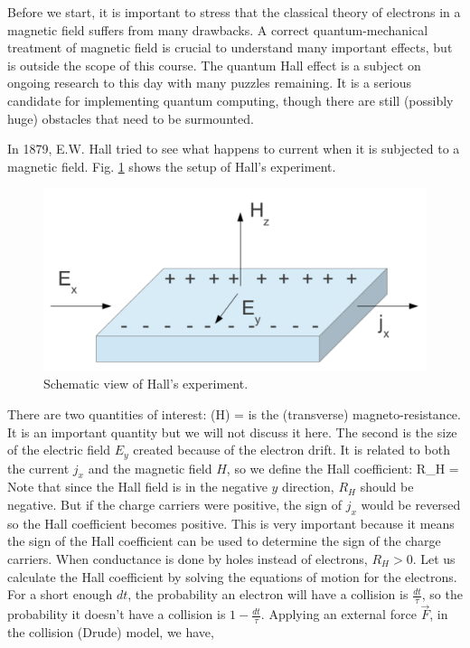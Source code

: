 \documentclass{Textbook}
\begin{document}
Before we start, it is important to stress that the classical theory of electrons in a magnetic field suffers from many drawbacks. A correct quantum-mechanical treatment of magnetic field is crucial to understand many important effects, but is outside the scope of this course. The quantum Hall effect is a subject on ongoing research to this day with many puzzles remaining. It is a serious candidate for implementing quantum computing, though there are still (possibly huge) obstacles that need to be surmounted.

\noindent In 1879, E.W. Hall tried to see what happens to current when it is subjected to a magnetic field. Fig. \ref{fig:Hall} shows the setup of Hall's experiment.\nl
\begin{figure}[!ht] 
  \centering
  \includegraphics[width=12cm]{Hall2.pdf}
  \caption{Schematic view of Hall's experiment.}
  \label{fig:Hall}
\end{figure}
There are two quantities of interest: 
\be
\rho(H) = 
\ee
is the (transverse) magneto-resistance. It is an important quantity but we will not discuss it here.\nl
The second is the size of the electric field $E_y$ created because of the electron drift. It is related to both the current $j_x$ and the magnetic field $H$, so we define the Hall coefficient:
\be 
R_H =  
\ee
Note that since the Hall field is in the negative $y$ direction, $R_H$ should be negative. But if the charge carriers were positive, the sign of $j_x$ would be reversed so the Hall coefficient becomes positive. This is very important because it means the sign of the Hall coefficient can be used to determine the sign of the charge carriers. When conductance is done by holes instead of electrons, $R_H>0$.\nl
Let us calculate the Hall coefficient by solving the equations of motion for the electrons. For a short enough $dt$, the probability an electron will have a collision is $\frac{dt}{\tau}$, so the probability it doesn't have a collision is $1-\frac{dt}{\tau}$. Applying an external force $\vec{F}$, in the collision (Drude) model, we have,
\end{document}
